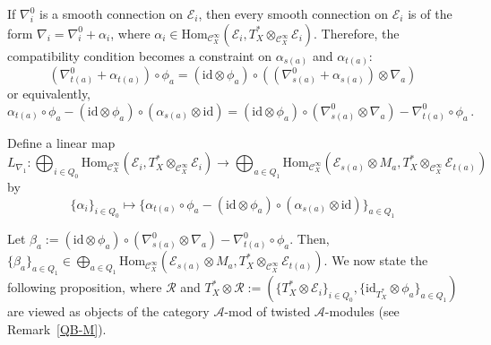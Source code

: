 \documentclass[12pt, reqno]{amsart}
\theoremstyle{plain}
\numberwithin{equation}{section}
\begin{document}
	
If $\nabla^0_{i}$ is a smooth connection on $\mathcal{E}_{i}$, then every smooth connection on $\mathcal{E}_i$ is of the form $\nabla_{i}=\nabla^0_{i} + \alpha_{i}$, where $\alpha_{i}\in \mathrm{Hom}_{\mathcal{C}^\infty_X}(\mathcal{E}_i, T^*_X \otimes_{\mathcal{C}^{\infty}_X}\mathcal{E}_{i})$. Therefore, the compatibility condition becomes a constraint on $\alpha_{s(a)}$ and $\alpha_{t(a)}$:
	\begin{equation*}
		\left(\nabla^{0}_{t(a)}+ \alpha_{t(a)}\right) \circ \phi_{a} = \left(\mathrm{id} \otimes \phi_{a}\right) \circ \left( (\nabla^{0}_{s(a)}+ \alpha_{s(a)}) \otimes \nabla_{a} \right)   
	\end{equation*}
	or equivalently,
	\begin{equation*}
		\alpha_{t(a)} \circ \phi_{a} - (\mathrm{id} \otimes \phi_{a}) \circ (\alpha_{s(a)}\otimes \mathrm{id})=(\mathrm{id} \otimes \phi_{a}) \circ (\nabla^{0}_{s(a)} \otimes \nabla_a) - \nabla^{0}_{t(a)} \circ \phi_{a}\,. 
	\end{equation*}
	
	Define a linear map
	\begin{equation}
		L_{\nabla_1}: \bigoplus_{i \in Q_{0}} \mathrm{Hom}_{\mathcal{C}^\infty_X}(\mathcal{E}_i, T^*_X \otimes_{\mathcal{C}^{\infty}_X}\mathcal{E}_{i})\longrightarrow \bigoplus_{a\in Q_{1}} \mathrm{Hom}_{\mathcal{C}^\infty_X}(\mathcal{E}_{s(a)} \otimes M_a, T^*_X \otimes_{\mathcal{C}^{\infty}_X}\mathcal{E}_{t(a)})
	\end{equation}
by
$$\{\alpha_{i}\}_{i \in Q_{0}} \mapsto \{\alpha_{t(a)} \circ \phi_{a} - (\mathrm{id} \otimes \phi_{a}) \circ (\alpha_{s(a)} \otimes \mathrm{id}) \}_{a\in Q_{1}}$$
	
	Let $\beta_{a}:=(\mathrm{id} \otimes \phi_{a}) \circ (\nabla^{0}_{s(a)} \otimes \nabla_a) - \nabla^{0}_{t(a)} \circ \phi_{a}$. Then, $\{\beta_{a}\}_{a\in Q_1} \in \bigoplus_{a\in Q_{1}} \mathrm{Hom}_{\mathcal{C}^\infty_X}(\mathcal{E}_{s(a)} \otimes M_a, T^*_X \otimes_{\mathcal{C}^{\infty}_X}\mathcal{E}_{t(a)})$. We now state the following proposition, where $\mathcal{R}$ and $T_X^* \otimes \mathcal{R}:=\left(\{T^*_X \otimes \mathcal{E}_i\}_{i\in Q_0}, \{\mathrm{id}_{T^*_X}\otimes \phi_a\}_{a\in Q_1}\right)$ are viewed as objects of the category $\mathcal{A}\text{-}\mathrm{mod}$ of twisted $\mathcal{A}$-modules (see Remark~\ref{QB-M}).
	
\end{document}
